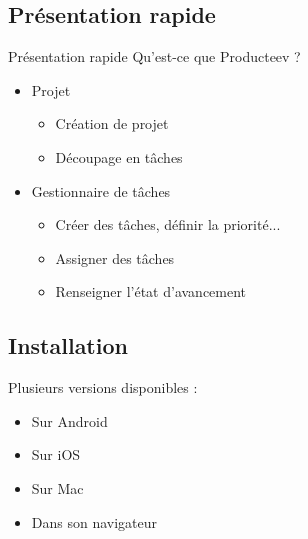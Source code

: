 \subsection{Présentation rapide}

\begin{frame}[fragile]{Présentation rapide}
  Qu'est-ce que Producteev ?
  \begin{itemize}
  \item Projet 
    \begin{itemize}
    \item Création de projet
    \item Découpage en tâches
    \end{itemize}
  \item Gestionnaire de tâches 
    \begin{itemize}
    \item Créer des tâches, définir la priorité...
    \item Assigner des tâches
    \item Renseigner l'état d'avancement
    \end{itemize}
  \end{itemize}
\end{frame}

\subsection{Installation}

\begin{frame}[Installation]
  Plusieurs versions disponibles :
  \begin{itemize}%
  \item Sur Android
  \item Sur iOS
  \item Sur Mac
  \item Dans son navigateur
  \end{itemize}
\end{frame}
